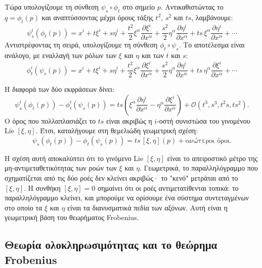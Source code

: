 \documentclass[12pt]{article}
\begin{document}
Τώρα υπολογίζουμε τη σύνθεση $\psi_s \circ \phi_t$ στο σημείο $p$. Αντικαθιστώντας το $q = \phi_t(p)$ και αναπτύσσοντας μέχρι όρους τάξης $t^2$, $s^2$ και $ts$, λαμβάνουμε:
\begin{equation}
\psi_s^i(\phi_t(p)) = x^i + t \xi^i + s \eta^i + \frac{t^2}{2} \xi^\alpha \frac{\partial \xi^i}{\partial x^\alpha} + \frac{s^2}{2} \eta^\alpha \frac{\partial \eta^i}{\partial x^\alpha} + ts \, \xi^\alpha \frac{\partial \eta^i}{\partial x^\alpha} + \cdots
\end{equation}
Αντιστρέφοντας τη σειρά, υπολογίζουμε τη σύνθεση $\phi_t \circ \psi_s$. Το αποτέλεσμα είναι ανάλογο, με εναλλαγή των ρόλων των $\xi$ και $\eta$ και των $t$ και $s$:
\begin{equation}
\phi_t^i(\psi_s(p)) = x^i + t \xi^i + s \eta^i + \frac{t^2}{2} \xi^\alpha \frac{\partial \xi^i}{\partial x^\alpha} + \frac{s^2}{2} \eta^\alpha \frac{\partial \eta^i}{\partial x^\alpha} + ts \, \eta^\alpha \frac{\partial \xi^i}{\partial x^\alpha} + \cdots
\end{equation}

Η διαφορά των δύο εκφράσεων δίνει:
\begin{equation}
\psi_s^i(\phi_t(p)) - \phi_t^i(\psi_s(p)) = ts \left( \xi^\alpha \frac{\partial \eta^i}{\partial x^\alpha} - \eta^\alpha \frac{\partial \xi^i}{\partial x^\alpha} \right) + \mathcal{O}(t^3, s^3, t^2 s, t s^2).
\end{equation}
Ο όρος που πολλαπλασιάζει το $ts$ είναι ακριβώς η $i$-οστή συνιστώσα του γινομένου Lie $[\xi, \eta]$. Έτσι, καταλήγουμε στη θεμελιώδη γεωμετρική σχέση:
\begin{equation}
\psi_s(\phi_t(p)) - \phi_t(\psi_s(p)) = ts \, [\xi, \eta](p) + \text{ανώτεροι όροι}.
\end{equation}

Η σχέση αυτή αποκαλύπτει ότι το γινόμενο Lie $[\xi, \eta]$ είναι το απειροστικό μέτρο της μη-αντιμεταθετικότητας των ροών των $\xi$ και $\eta$. Γεωμετρικά, το παραλληλόγραμμο που σχηματίζεται από τις δύο ροές δεν κλείνει ακριβώς· το "κενό" μετράται από το $[\xi, \eta]$. Η συνθήκη $[\xi, \eta] = 0$ σημαίνει ότι οι ροές αντιμετατίθενται τοπικά: το παραλληλόγραμμο κλείνει, και μπορούμε να ορίσουμε ένα σύστημα συντεταγμένων στο οποίο τα $\xi$ και $\eta$ είναι τα διανυσματικά πεδία των αξόνων. Αυτή είναι η γεωμετρική βάση του θεωρήματος Frobenius.

\subsection{Θεωρία ολοκληρωσιμότητας και το θεώρημα Frobenius}
\end{document}

